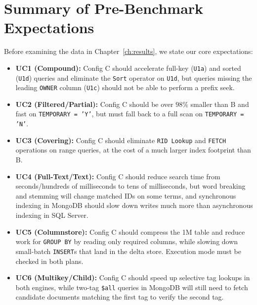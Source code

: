 \section{Summary of Pre-Benchmark Expectations}
Before examining the data in Chapter~\ref{ch:results}, we state our core expectations:
\begin{itemize}
\item \textbf{UC1 (Compound):} Config C should accelerate full-key (\texttt{U1a}) and sorted (\texttt{U1d}) queries and eliminate the \texttt{Sort} operator on \texttt{U1d}, but queries missing the leading \texttt{OWNER} column (\texttt{U1c}) should not be able to perform a prefix seek.
\item \textbf{UC2 (Filtered/Partial):} Config C should be over $98\%$ smaller than B and fast on \texttt{TEMPORARY = 'Y'}, but must fall back to a full scan on \texttt{TEMPORARY = 'N'}.
\item \textbf{UC3 (Covering):} Config C should eliminate \texttt{RID Lookup} and \texttt{FETCH} operations on range queries, at the cost of a much larger index footprint than B.
\item \textbf{UC4 (Full-Text/Text):} Config C should reduce search time from seconds/hundreds of milliseconds to tens of milliseconds, but word breaking and stemming will change matched IDs on some terms, and synchronous indexing in MongoDB should slow down writes much more than asynchronous indexing in SQL Server.
\item \textbf{UC5 (Columnstore):} Config C should compress the 1M table and reduce work for \texttt{GROUP BY} by reading only required columns, while slowing down small-batch \texttt{INSERT}s that land in the delta store. Execution mode must be checked in both plans.
\item \textbf{UC6 (Multikey/Child):} Config C should speed up selective tag lookups in both engines, while two-tag \texttt{\$all} queries in MongoDB will still need to fetch candidate documents matching the first tag to verify the second tag.
\end{itemize}
\FloatBarrier
